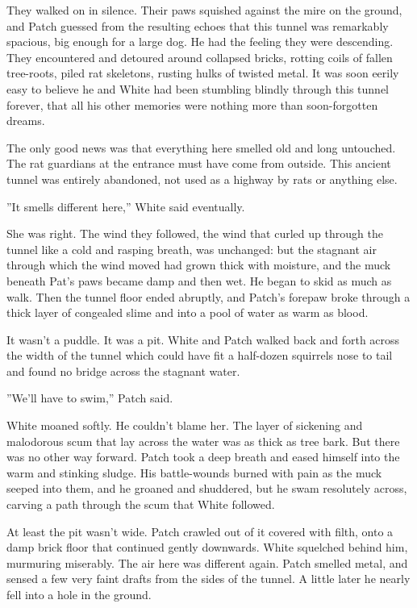 \documentclass[11pt]{article}
\begin{document}
 They walked on in silence. Their paws squished against the mire on the ground, and Patch guessed from the resulting echoes that this tunnel was remarkably spacious, big enough for a large dog. He had the feeling they were descending. They encountered and detoured around collapsed bricks, rotting coils of fallen tree-roots, piled rat skeletons, rusting hulks of twisted metal. It was soon eerily easy to believe he and White had been stumbling blindly through this tunnel forever, that all his other memories were nothing more than soon-forgotten dreams.\par
 The only good news was that everything here smelled old and long untouched. The rat guardians at the entrance must have come from outside. This ancient tunnel was entirely abandoned, not used as a highway by rats or anything else.\par
 ''It smells different here,'' White said eventually.\par
 She was right. The wind they followed, the wind that curled up through the tunnel like a cold and rasping breath, was unchanged: but the stagnant air through which the wind moved had grown thick with moisture, and the muck beneath Pat's paws became damp and then wet. He began to skid as much as walk. Then the tunnel floor ended abruptly, and Patch's forepaw broke through a thick layer of congealed slime and into a pool of water as warm as blood.\par
 It wasn't a puddle. It was a pit. White and Patch walked back and forth across the width of the tunnel %
 which could have fit a half-dozen squirrels nose to tail %
 and found no bridge across the stagnant water.\par
 ''We'll have to swim,'' Patch said.\par
 White moaned softly. He couldn't blame her. The layer of sickening and malodorous scum that lay across the water was as thick as tree bark. But there was no other way forward. Patch took a deep breath and eased himself into the warm and stinking sludge. His battle-wounds burned with pain as the muck seeped into them, and he groaned and shuddered, but he swam resolutely across, carving a path through the scum that White followed.\par
 At least the pit wasn't wide. Patch crawled out of it covered with filth, onto a damp brick floor that continued gently downwards. White squelched behind him, murmuring miserably. The air here was different again. Patch smelled metal, and sensed a few very faint drafts from the sides of the tunnel. A little later he nearly fell into a hole in the ground.\par
\end{document}
